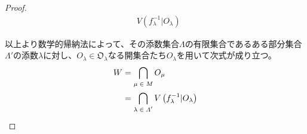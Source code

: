 \documentclass[dvipdfmx]{jsarticle}
\begin{document}
\begin{proof}
\begin{align*}
{\begin{matrix}
\end{matrix}} {V\left( f_{\lambda}^{- 1}|O_{\lambda} \right)}
\end{align*}\par
以上より数学的帰納法によって、その添数集合$\varLambda$の有限集合であるある部分集合$\varLambda'$の添数$\lambda$に対し、$O_{\lambda} \in \mathfrak{O}_{\lambda}$なる開集合たち$O_{\lambda}$を用いて次式が成り立つ。
\begin{align*}
W &= \bigcap_{\scriptsize \begin{matrix}
\mu \in M \\
\end{matrix}} O_{\mu}\\
&= \bigcap_{\scriptsize \begin{matrix}
\lambda \in \varLambda' \\
\end{matrix}} {V\left( f_{\lambda}^{- 1}|O_{\lambda} \right)}
\end{align*}
\end{proof}
\end{document}
